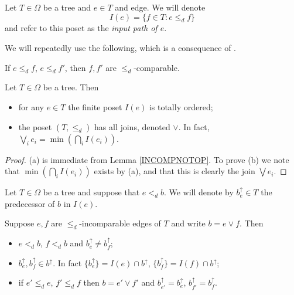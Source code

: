 \documentclass[a4paper,10pt]{article}%
\begin{document}
\begin{notation}\label{INPUTPATH NOT}
	Let $T \in \Omega$ be a tree and $e \in T$ and edge. We will denote
	\[ I(e) =\{f \in T \colon e \leq_d f \} \]
and refer to this poset as the \textit{input path of $e$}.
\end{notation}

We will repeatedly use the following, which is a consequence of \cite[Cor. 5.26]{Pe17}.

\begin{lemma}\label{INCOMPNOTOP}
If $e \leq_d f$, $e \leq_d f'$, then $f,f'$ are $\leq_d$-comparable. 
\end{lemma} 

\begin{proposition}\label{INPUTPATHS PROP}
	Let $T \in \Omega$ be a tree. Then
	\begin{itemize}
		\item[(a)] for any $e \in T$ the finite poset $I(e)$ is totally ordered;
		\item[(b)] the poset $(T,\leq_d)$ has all joins, denoted $\vee$. In fact, $\bigvee_{i} e_i = \min (\bigcap_{i} I(e_i))$.
	\end{itemize}
\end{proposition}

\begin{proof}
	(a) is immediate from Lemma \ref{INCOMPNOTOP}.
To prove (b) we note that 
	$\min (\bigcap_{i} I(e_i))$ exists by (a), and that this is clearly the join $\bigvee{e_i}$.
\end{proof}


\begin{notation}
	Let $T \in \Omega$ be a tree and suppose that $e <_d b$. We will denote by $b^{\uparrow}_e \in T$ the predecessor of $b$ in $I(e)$.
\end{notation}


\begin{proposition}\label{INPUTPREDECESSORPROP PROP}
Suppose $e,f$ are $\leq_d$-incomparable edges of $T$ and write $b= e \vee f$. Then
\begin{itemize}
\item [(a)] $e <_d b$, $f<_d b$ and $b^{\uparrow}_e \neq b^{\uparrow}_f$;
\item [(b)] $b^{\uparrow}_e, b^{\uparrow}_f \in b^{\uparrow}$. In fact $\{b^{\uparrow}_e\} = I(e) \cap b^{\uparrow}$,
$\{b^{\uparrow}_f\} = I(f) \cap b^{\uparrow}$;
\item[(c)] if $e' \leq_d e$, $f' \leq_d f$ then 
$b = e' \vee f'$ and $b^{\uparrow}_{e'} = b^{\uparrow}_{e}$, $b^{\uparrow}_{f'} = b^{\uparrow}_{f}$.
\end{itemize}
\end{proposition}
\end{document}
